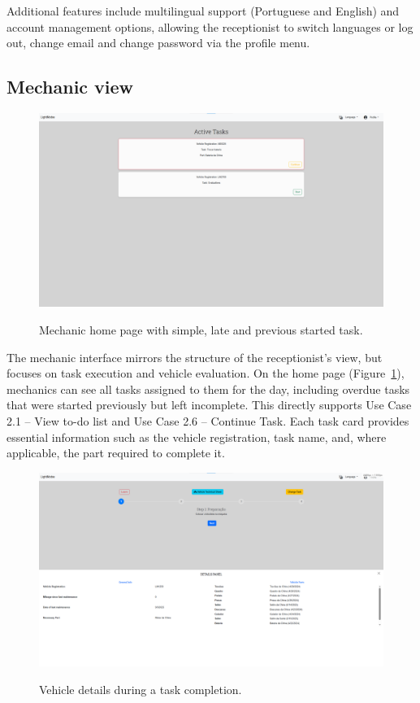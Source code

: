 Additional features include multilingual support (Portuguese and English) and account management options, allowing the receptionist to switch languages or log out, change email and change password via the profile menu.


\subsection{Mechanic view}


\begin{figure}[h]
  \caption{Mechanic home page with simple, late and previous started task.}
  \centering
  \includegraphics[width=\textwidth]{figs/Implementation/mechanic/HomeShowTasks}
  \label{fig:HomeShowTasks}
\end{figure}





The mechanic interface mirrors the structure of the receptionist's view, but focuses on task execution and vehicle evaluation. On the home page (Figure~\ref{fig:HomeShowTasks}), mechanics can see all tasks assigned to them for the day, including overdue tasks that were started previously but left incomplete. This directly supports Use Case 2.1 – View to-do list and Use Case 2.6 – Continue Task. Each task card provides essential information such as the vehicle registration, task name, and, where applicable, the part required to complete it.



\begin{figure}[h]
  \caption{Vehicle details during a task completion.}
  \centering
  \includegraphics[width=\textwidth]{figs/Implementation/mechanic/MechanicTaskVehicleDetails}
  \label{fig:MechanicTaskVehicleDetails}
\end{figure}



